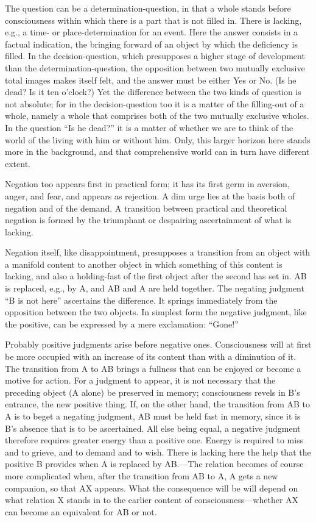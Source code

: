 \documentclass[12pt,a4paper]{book}
\newcommand{\opage}[1]{\marginnote{\footnotesize\textit{[#1]}}}
\begin{document}
The question can be a determination-question, in that a whole stands
before consciousness within which there is a part that is not filled in.
There is lacking, e.g., a time- or place-determination for an event. Here
the answer consists in a factual indication, the bringing forward of an
object by which the deficiency is filled. In the decision-question, which
presupposes a higher stage of development than the determination-question,
the opposition between two mutually exclusive total images makes itself
felt, and the answer must be either Yes or No. (Is he dead? Is it ten
o'clock?) Yet the difference between the two kinds of question is not
absolute; for in the decision-question too it is a matter of the
filling-out of a whole, namely a whole that comprises both of the two
mutually exclusive wholes. In the question ``Is he \opage{76}dead?'' it is a matter
of whether we are to think of the world of the living with him or without
him. Only, this larger horizon here stands more in the background, and
that comprehensive world can in turn have different extent.

Negation too appears first in practical form; it has its first germ in
aversion, anger, and fear, and appears as rejection. A dim urge lies at
the basis both of negation and of the demand. A transition between
practical and theoretical negation is formed by the triumphant or
despairing ascertainment of what is lacking.

Negation itself, like disappointment, presupposes a transition from an
object with a manifold content to another object in which something of
this content is lacking, and also a holding-fast of the first object after
the second has set in. AB is replaced, e.g., by A, and AB and A are held
together. The negating judgment ``B is not here'' ascertains the
difference. It springs immediately from the opposition between the two
objects. In simplest form the negative judgment, like the positive, can be
expressed by a mere exclamation: ``Gone!''

Probably positive judgments arise before negative ones. Consciousness
will at first be more occupied with an increase of its content than with a
diminution of it. The transition from A to AB brings a fullness that can
be enjoyed or become a motive for action. For a judgment to appear, it is
not necessary that the preceding object (A alone) be preserved in memory;
consciousness revels in B's entrance, the new positive thing. If, on the
other hand, the transition from AB to A is to beget a negating judgment,
AB must be held fast in memory, since it is B's absence that is to be
ascertained. All else being equal, a negative judgment therefore requires
greater energy than a positive one. Energy is required to miss and to
grieve, and to demand and to wish. There is lacking here the help that the
positive B provides when A is replaced by AB.---The relation becomes of
course more complicated when, after the transition from AB to A, A gets a
new companion, so that AX appears. What the consequence will be will
depend on what relation X stands in to the earlier content of
consciousness---whether AX can become an equivalent for AB or not.
\end{document}

